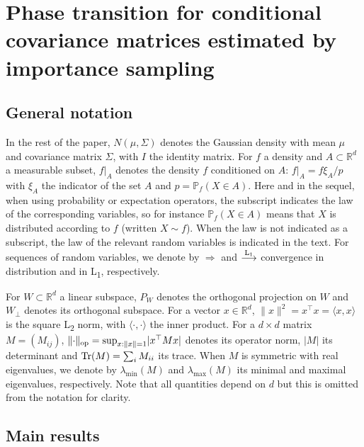 \documentclass[]{article}
\renewcommand{\P}{\mathbb{P}}
\newcommand{\R}{\mathbb{R}}
\newcommand{\Tr}{\text{\rm Tr}}
\newcommand{\Lone}{\stackrel{\text{\textnormal{L\textsubscript{1}}}}{\longrightarrow}}
\newcommand{\op}{{\rm op}}
\theoremstyle{plain}
\theoremstyle{definition}
\begin{document}
\section{Phase transition for conditional covariance matrices estimated by importance sampling} \label{sec:main-thm}


\subsection{General notation}

In the rest of the paper, $N(\mu, \Sigma)$ denotes the Gaussian density with mean $\mu$ and covariance matrix $\Sigma$, with $I$ the identity matrix. For $f$ a density and $A \subset \R^d$ a measurable subset, $f|_A$ denotes the density $f$ conditioned on $A$: $f|_A = f \xi_A / p$ with $\xi_A$ the indicator of the set $A$ and $p = \P_f(X \in A)$. Here and in the sequel, when using probability or expectation operators, the subscript indicates the law of the corresponding variables, so for instance $\P_f(X \in A)$ means that $X$ is distributed according to $f$ (written $X \sim f$). When the law is not indicated as a subscript, the law of the relevant random variables is indicated in the text. For sequences of random variables, we denote by $\Rightarrow$ and $\Lone$ convergence in distribution and in L\textsubscript{1}, respectively.

For $W \subset \R^d$ a linear subspace, $P_W$ denotes the orthogonal projection on $W$ and $W_\perp$ denotes its orthogonal subspace. For a vector $x \in \R^d$, $\lVert x \rVert^2 = x^\top x = \langle x, x \rangle$ is the square L\textsubscript2 norm, with $\langle \cdot, \cdot \rangle$ the inner product. For a $d \times d$ matrix $M = (M_{ij})$, $\lVert \cdot \rVert_\op = \sup_{x: \lVert x \rVert = 1} \lvert x^\top M x \rvert$ denotes its operator norm, $\lvert M \rvert$ its determinant and $\Tr(M) = \sum_i M_{ii}$ its trace. When $M$ is symmetric with real eigenvalues, we denote by $\lambda_{\min}(M)$ and $\lambda_{\max}(M)$ its minimal and maximal eigenvalues, respectively. Note that all quantities depend on $d$ but this is omitted from the notation for clarity. 

\subsection{Main results}
\end{document}
